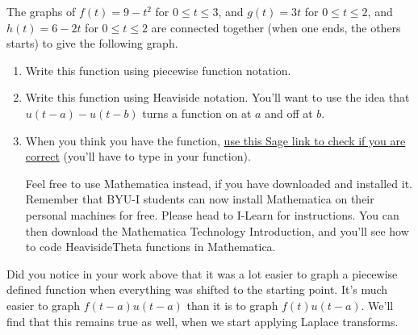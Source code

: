 \begin{problem}
The graphs of $f(t)=9-t^2$ for $0\leq t\leq3$, and $g(t)=3t$ for $0\leq t\leq 2$, and $h(t) = 6-2t$ for $0\leq t\leq 2$ are connected together (when one ends, the others starts) to give the following graph.
\begin{center}
\end{center}
\begin{enumerate}
 \item Write this function using piecewise function notation.
 \item Write this function using Heaviside notation. You'll want to use the idea that $u(t-a)-u(t-b)$ turns a function on at $a$ and off at $b$. 
 \item When you think you have the function, \href{http://aleph.sagemath.org/?z=eJwrSyzSUC9R1-RK0yjRtNUwNNAt0dTSyEhNLMsszkxJ1SjRNdHUReaaa2pycRXk5JdogHToaJToGOhYaGoCAP0RFH0=&lang=sage}{use this Sage link to check if you are correct} (you'll have to type in your function). 

 Feel free to use Mathematica instead, if you have downloaded and installed it.  Remember that BYU-I students can now install Mathematica on their personal machines for free. Please head to I-Learn for instructions.  You can then download the Mathematica Technology Introduction, and you'll see how to code HeavisideTheta functions in Mathematica. 
\end{enumerate}

\end{problem}

Did you notice in your work above that it was a lot easier to graph a piecewise defined function when everything was shifted to the starting point.  It's much easier to graph $f(t-a)u(t-a)$ than it is to graph $f(t)u(t-a)$.  We'll find that this remains true as well, when we start applying Laplace transforms.  

